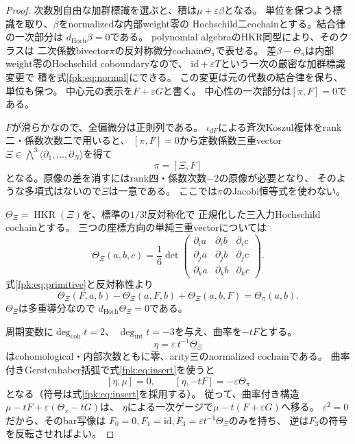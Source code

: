 \begin{proof}
次数別自由な加群標識を選ぶと、積は$\mu+\varepsilon\beta$となる。
単位を保つよう標識を取り、$\beta$をnormalizedな内部weight零の
Hochschild二cochainとする。結合律の一次部分は
$d_{\mathrm{Hoch}}\beta=0$である。
polynomial algebraのHKR同型により、そのクラスは
二次係数bivector$\pi$の反対称微分cochain$\Theta_\pi$で表せる。
差$\beta-\Theta_\pi$は内部weight零のHochschild coboundaryなので、
$\mathrm{id}+\varepsilon T$という一次の厳密な加群標識変更で
積を式\eqref{fpk:eq:normal}にできる。
この変更は元の代数の結合律を保ち、単位も保つ。
中心元の表示を$F+\varepsilon G$と書く。
中心性の一次部分は$[\pi,F]=0$である。

$F$が滑らかなので、全偏微分は正則列である。
$\iota_{dF}$による斉次Koszul複体をrank二・係数次数二で用いると、
$[\pi,F]=0$から定数係数三重vector
$\Xi\in\bigwedge^3\langle\partial_1,\ldots,\partial_N\rangle$を得て
\begin{equation}\label{fpk:eq:primitive}
 \pi=[\Xi,F]
\end{equation}
となる。原像の差を消すにはrank四・係数次数$-2$の原像が必要となり、
そのような多項式はないので$\Xi$は一意である。
ここでは$\pi$のJacobi恒等式を使わない。

$\Theta_\Xi=\operatorname{HKR}(\Xi)$を、標準の$1/3!$反対称化で
正規化した三入力Hochschild cochainとする。
三つの座標方向の単純三重vectorについては
\[
 \Theta_\Xi(a,b,c)
 =\frac16\det
 \begin{pmatrix}
  \partial_i a&\partial_i b&\partial_i c\\
  \partial_j a&\partial_j b&\partial_j c\\
  \partial_k a&\partial_k b&\partial_k c
 \end{pmatrix}.
\]
式\eqref{fpk:eq:primitive}と反対称性より
\begin{equation}\label{fpk:eq:insert}
 \Theta_\Xi(F,a,b)-\Theta_\Xi(a,F,b)+\Theta_\Xi(a,b,F)
 =\Theta_\pi(a,b).
\end{equation}
$\Theta_\Xi$は多重導分なので
$d_{\mathrm{Hoch}}\Theta_\Xi=0$である。

周期変数に$\deg_{\mathrm{coh}}t=2$、
$\deg_{\mathrm{int}}t=-3$を与え、曲率を$-tF$とする。
\[
 \eta=\varepsilon\,t^{-1}\Theta_\Xi
\]
はcohomological・内部次数ともに零、arity三のnormalized cochainである。
曲率付きGerstenhaber括弧で式\eqref{fpk:eq:insert}を使うと
\[
 [\eta,\mu]=0,\qquad
 [\eta,-tF]=-\varepsilon\Theta_\pi
\]
となる（符号は式\eqref{fpk:eq:insert}を採用する）。
従って、曲率付き構造
$\mu-tF+\varepsilon(\Theta_\pi-tG)$は、
$\eta$による一次ゲージで$\mu-t(F+\varepsilon G)$へ移る。
$\varepsilon^2=0$だから、そのbar写像は
$F_0=0,F_1=\mathrm{id},F_3=\varepsilon t^{-1}\Theta_\Xi$のみを持ち、
逆は$F_3$の符号を反転させればよい。


\end{proof}
